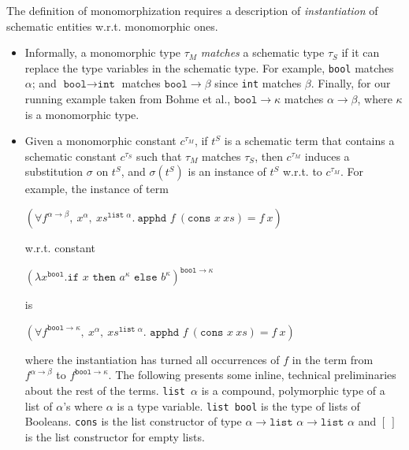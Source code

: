 \documentclass{article}
\begin{document}
		The definition of monomorphization 
		requires a description of 
		\textit{instantiation} of schematic 
		entities w.r.t. 
		monomorphic ones.
		\begin{itemize}
		\item Informally, a monomorphic type 
			$\tau_M$ \textit{matches} a schematic 
			type $\tau_S$ if it can replace the 
			type variables in the schematic 
			type. For example, \texttt{bool} 
			matches $\alpha$; and $\texttt{bool} 
			\to \texttt{int}$ matches 
			$\texttt{bool} \to \beta$
			since \texttt{int} matches 
			$\beta$. Finally, for our running 
			example taken from Bohme et al., 
			${\texttt{bool} \to \kappa}$
			matches $\alpha \to \beta$,
			where $\kappa$ is a monomorphic
			type. 
			
		\item Given a monomorphic constant 
			$c^{\tau_M}$,  if $t^S$ is a 
			schematic term that contains a 
			schematic constant $c^{\tau_S}$ 
			such that $\tau_M$ matches 
			$\tau_S$, then $c^{\tau_M}$ induces 
			a substitution $\sigma$ on $t^S$, 
			and $\sigma(t^S)$ is an instance of 
			$t^S$ w.r.t. to $c^{\tau_M}$. 
			For example, the instance of term
			\begin{center}
				$(\forall f^{\alpha \to \beta},\ 
				x^{\alpha},\ xs^{\texttt{list }
				\alpha}.\ \texttt{apphd }f\ 
				(\texttt{cons }x\ xs) = f\ x)$
			\end{center} 
			w.r.t. constant
			\begin{center}
				$(\lambda x^{\texttt{bool}}.
				\texttt{if }x\texttt{ then }
				a^{\kappa} \texttt{ else }
				b^{\kappa})^{\texttt{bool} \to 
				\kappa}$ 
			\end{center}
			is
			\begin{center}
				$(\forall f^{\texttt{bool} 
				\to \kappa},\ x^{\alpha},\ 
				xs^{\texttt{list }\alpha}. 
				\texttt{ apphd }f\ (\texttt{cons }
				x \ xs) = f\ x)$
			\end{center}
			where the instantiation 
			has turned all occurrences of $f$ 
			in the term from $f^{\alpha \to \beta}$ 
			to $f^{\texttt{bool} \to \kappa}$.
			The following presents some inline, 
			technical preliminaries about 
			the rest of the terms.
			\texttt{list $\alpha$} is a compound,
			polymorphic type of a list of 
			$\alpha$'s where $\alpha$ is a type 
			variable. \texttt{list bool} is the 
			type of lists of Booleans. \texttt{cons} 
			is the list constructor of type 
			$\alpha \to \texttt{list }\alpha \to 
			\texttt{list }\alpha$ and $[\ ]$ is 
			the list constructor for empty lists. 

\end{itemize}
\end{document}
